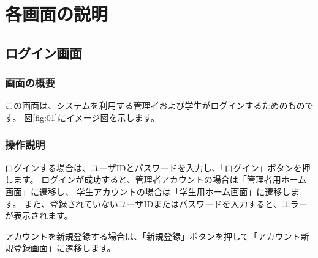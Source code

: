 \section{各画面の説明}
\subsection{ログイン画面}
\subsubsection{画面の概要}
この画面は、システムを利用する管理者および学生がログインするためのものです。
図\ref{fig:01}にイメージ図を示します。

\subsubsection{操作説明}
ログインする場合は、ユーザIDとパスワードを入力し、「ログイン」ボタンを押します。
ログインが成功すると、管理者アカウントの場合は「管理者用ホーム画面」に遷移し、
学生アカウントの場合は「学生用ホーム画面」に遷移します。
また、登録されていないユーザIDまたはパスワードを入力すると、エラーが表示されます。

アカウントを新規登録する場合は、「新規登録」ボタンを押して「アカウント新規登録画面」に遷移します。

\newpage



